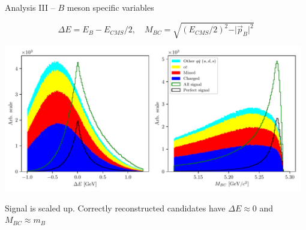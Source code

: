 \documentclass[serif]{beamer}
\begin{document}
\begin{frame}[t]{Analysis III -- $B$ meson specific variables}

\vspace{-3mm}
\small

$$\Delta E = E_B - E_{CMS}/2,\quad M_{BC} = \sqrt{\left(E_{CMS}/2\right)^2 - \vert \vec{p}_B \vert^2}$$

\begin{center}
	\includegraphics[width=0.98\textwidth]{fig/mbc_de_pre}
\end{center}

Signal is scaled up. Correctly reconstructed candidates have $\Delta E \approx 0$ and $M_{BC} \approx m_B$

\end{frame}


\end{document}
